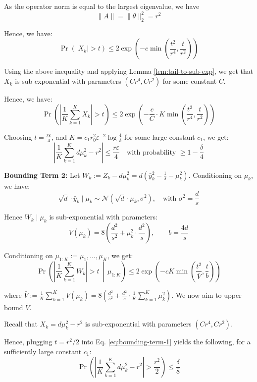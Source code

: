 As the operator norm is equal to the largest eigenvalue, we have
\[
\|A\| = \|\theta\|_2^2 = r^2
\]


Hence, we have:
\[
\Pr\left( |X_k| > t \right) \leq 2 \exp\left( -c \min\left( \frac{t^2}{r^4}, \frac{t}{r^2} \right) \right)
\]



Using the above inequality and applying Lemma \ref{lem:tail-to-sub-exp}, we get that $X_k$ is sub-exponential with parameters $(C r^4, C r^2)$ for some constant $C$.


Hence, we have:
\begin{equation}\label{eq:bounding-term-1}
    \Pr\left( \left| \frac{1}{K} \sum_{k=1}^{K} X_k \right| > t \right) 
\leq 2 \exp\left( -\frac{c}{C}\cdot K \min\left( \frac{t^2}{r^4}, \frac{t}{r^2} \right) \right)
\end{equation}


Choosing $t = \frac{r \varepsilon}{4}$, and $K = c_1 r_0^2 \varepsilon^{-2} \log \frac{4}{\delta}$ for some large constant $c_1$,  
we get:
\[
\left| \frac{1}{K} \sum_{k=1}^{K} d\mu_k^2 - r^2 \right| 
\leq \frac{r \varepsilon}{4} \quad \text{with probability } \geq 1 - \frac{\delta}{4}
\]



\textbf{Bounding Term 2:}  Let $W_k := Z_k - d\mu_k^2 = d\left( \bar{y}_k^2 - \frac{1}{s} - \mu_k^2 \right)$. Conditioning on $\mu_k$, we have:
\[
\sqrt{d} \cdot \bar{y}_k \mid \mu_k \sim \mathcal{N}(\sqrt{d}\cdot\mu_k, \sigma^2), \quad \text{with } \sigma^2 = \frac{d}{s}
\]

Hence $W_k \mid \mu_k$ is sub-exponential with parameters:
\[
V(\mu_k) = 8 \left( \frac{d^2}{s^2} + \mu_k^2 \cdot \frac{d^2}{s} \right), \qquad b = \frac{4d}{s}
\]

Conditioning on $\mu_{1:K} := \mu_1, \ldots, \mu_K$, we get:
\[
\Pr\left( \left| \frac{1}{K} \sum_{k=1}^{K} W_k \right| > t \,\middle|\, \mu_{1:K} \right) 
\leq 2 \exp\left( -cK \min\left( \frac{t^2}{\bar{V}}, \frac{t}{b} \right) \right)
\]

where $
\bar{V} := \frac{1}{K} \sum_{k=1}^{K} V(\mu_k)=8 \left( \frac{d^2}{s^2} + \frac{d^2}{s} \cdot \frac{1}{K} \sum_{k=1}^{K} \mu_k^2 \right).
$ We now aim to upper bound
$
\bar{V}.
$

Recall that $X_k = d \mu_k^2 - r^2$ is sub-exponential with parameters $(Cr^4, Cr^2)$.

Hence, plugging $t=r^2/2$ into Eq. \eqref{eq:bounding-term-1} yields the following, for a sufficiently large constant $c_1$:
\[
\Pr\left( \left| \frac{1}{K} \sum_{k=1}^{K} d \mu_k^2 - r^2 \right| > \frac{r^2}{2} \right) 
\leq \frac{\delta}{8}
\]

